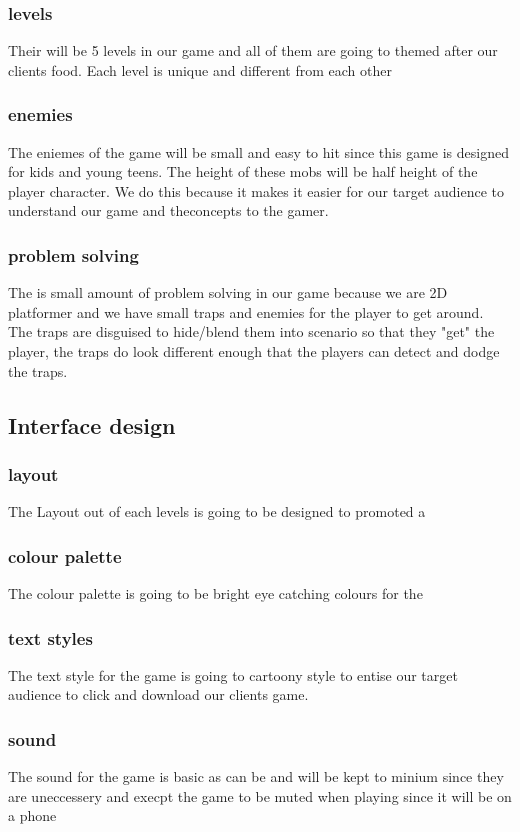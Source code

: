 \documentclass{article}
\begin{document}
\subsubsection{levels}
Their will be 5 levels in our game and all of them are going to themed after our clients food. Each level is unique and different from each other 

\subsubsection{enemies}
The eniemes of the game will be small and easy to hit since this game is designed for kids and young teens. The height of these mobs will be half height of the player character. We do this because it makes it easier for our target audience to understand our game and theconcepts to the gamer. 


\subsubsection{problem solving}
The is small amount of problem solving in our game because we are 2D platformer and we have small traps and enemies for the player to get around. The traps are disguised to hide/blend them into scenario so that they "get" the player, the traps do look different enough that the players can detect and dodge the traps.

\subsection{Interface design}
\subsubsection{layout}
The Layout out of each levels is going to be designed to promoted a 

\subsubsection{colour palette}
The colour palette is going to be bright eye catching colours for the  

\subsubsection{text styles}
The text style for the game is going to cartoony style to entise our target audience to click and download our clients game. 

\subsubsection{sound}
The sound for the game is basic as can be and will be kept to minium since they are uneccessery and execpt the game to be muted when playing since it will be on a phone
\end{document}
